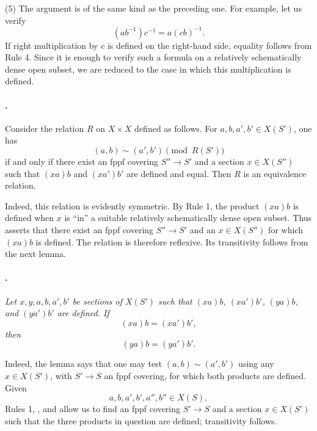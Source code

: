 \textup{(5)} The argument is of the same kind as the preceding
one. For example, let us verify
\[
  (ab^{-1})c^{-1}=a(cb)^{-1}.
\]
If right multiplication by \(c\) is defined on the right-hand
side, equality follows from Rule 4. Since it is enough to verify
such a formula on a relatively schematically dense open subset, we
are reduced to the case in which this multiplication is defined.

\paragraph{.}
Consider the relation \(R\) on \(X\times X\) defined as follows.
For \(a,b,a',b'\in X(S')\), one has
\[
  (a,b)\sim(a',b')\pmod{R(S')}
\]
if and only if there exist an fppf covering \(S''\to S'\) and a
section \(x\in X(S'')\) such that \((xa)b\) and \((xa')b'\) are
defined and equal. Then \(R\) is an equivalence relation.

Indeed, this relation is evidently symmetric. By Rule 1, the
product \((xa)b\) is defined when \(x\) is ``in'' a suitable
relatively schematically dense open subset. Thus  asserts that
there exist an fppf covering \(S''\to S'\) and an
\(x\in X(S'')\) for which \((xa)b\) is defined. The relation is
therefore reflexive. Its transitivity follows from the next lemma.

\paragraph{.}
\textit{Let \(x,y,a,b,a',b'\) be sections of \(X(S')\) such that
\((xa)b\), \((xa')b'\), \((ya)b\), and \((ya')b'\) are defined. If
\[
  (xa)b=(xa')b',
\]
then
\[
  (ya)b=(ya')b'.
\]}

Indeed, the lemma says that one may test
\((a,b)\sim(a',b')\) using any \(x\in X(S')\), with
\(S'\to S\) an fppf covering, for which both products are defined.
Given
\[
  a,b,a',b',a'',b''\in X(S),
\]
Rules 1, , and  allow us to find an fppf covering
\(S'\to S\) and a section \(x\in X(S')\) such that the three
products in question are defined; transitivity follows.

